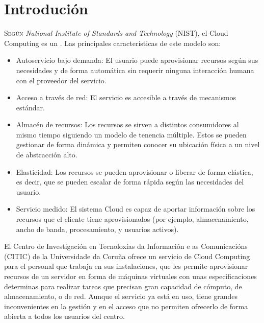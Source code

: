 \chapter{Introdución}
\label{chap:introducion}
\lettrine{S}{egún} \textit{National Institute of Standards and Technology} (NIST), el Cloud Computing es un \cite{DefCloudComputing}. Las principales características de este modelo son:
\begin{itemize}
    \item Autoservicio bajo demanda: El usuario puede aprovisionar recursos según sus necesidades y de forma automática sin requerir ninguna interacción humana con el proveedor del servicio.
    \item Acceso a través de red: El servicio es accesible a través de mecanismos estándar.
    \item Almacén de recursos: Los recursos se sirven a distintos consumidores al mismo tiempo siguiendo un modelo de tenencia múltiple. Estos se pueden gestionar de forma dinámica y permiten conocer su ubicación física a un nivel de abstracción alto.
    \item Elasticidad: Los recursos se pueden aprovisionar o liberar de forma elástica, es decir, que se pueden escalar de forma rápida según las necesidades del usuario.
    \item Servicio medido: El sistema Cloud es capaz de aportar información sobre los recursos que el cliente tiene aprovisionados (por ejemplo, almacenamiento, ancho de banda, procesamiento, y usuarios activos).
\end{itemize}
 
 El Centro de Investigación en Tecnoloxías da Información e as Comunicacións (CITIC) de la Universidade da Coruña ofrece un servicio de Cloud Computing para el personal que trabaja en sus instalaciones, que les permite aprovisionar recursos de un servidor en forma de máquinas virtuales con unas especificaciones determinas para realizar tareas que precisan gran capacidad de cómputo, de almacenamiento, o de red. Aunque el servicio ya está en uso, tiene grandes inconvenientes en la gestión y en el acceso que no permiten ofrecerlo de forma abierta a todos los usuarios del centro.\\
 
